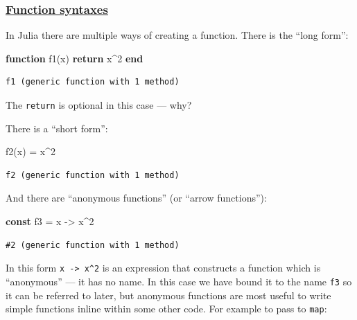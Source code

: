 \documentclass[
]{article}
\newenvironment{Shaded}{\begin{snugshade}}{\end{snugshade}}
\newcommand{\ControlFlowTok}[1]{\textcolor[rgb]{0.00,0.23,0.31}{\textbf{#1}}}
\newcommand{\FloatTok}[1]{\textcolor[rgb]{0.68,0.00,0.00}{#1}}
\newcommand{\FunctionTok}[1]{\textcolor[rgb]{0.28,0.35,0.67}{#1}}
\newcommand{\KeywordTok}[1]{\textcolor[rgb]{0.00,0.23,0.31}{\textbf{#1}}}
\newcommand{\NormalTok}[1]{\textcolor[rgb]{0.00,0.23,0.31}{#1}}
\newcommand{\OperatorTok}[1]{\textcolor[rgb]{0.37,0.37,0.37}{#1}}
\begin{document}
\subsubsection{\texorpdfstring{\href{https://docs.julialang.org/en/v1/manual/functions/\#man-functions}{Function
syntaxes}}{Function syntaxes}}\label{function-syntaxes}

In Julia there are multiple ways of creating a function. There is the
``long form'':

\begin{Shaded}
\begin{Highlighting}[]
\KeywordTok{function} \FunctionTok{f1}\NormalTok{(x)}
   \ControlFlowTok{return}\NormalTok{ x}\OperatorTok{\^{}}\FloatTok{2}
\KeywordTok{end}
\end{Highlighting}
\end{Shaded}

\begin{verbatim}
f1 (generic function with 1 method)
\end{verbatim}

The \texttt{return} is optional in this case --- why?

There is a ``short form'':

\begin{Shaded}
\begin{Highlighting}[]
\FunctionTok{f2}\NormalTok{(x) }\OperatorTok{=}\NormalTok{ x}\OperatorTok{\^{}}\FloatTok{2}
\end{Highlighting}
\end{Shaded}

\begin{verbatim}
f2 (generic function with 1 method)
\end{verbatim}

And there are ``anonymous functions'' (or ``arrow functions''):

\begin{Shaded}
\begin{Highlighting}[]
\KeywordTok{const}\NormalTok{ f3 }\OperatorTok{=}\NormalTok{ x }\OperatorTok{{-}\textgreater{}}\NormalTok{ x}\OperatorTok{\^{}}\FloatTok{2}
\end{Highlighting}
\end{Shaded}

\begin{verbatim}
#2 (generic function with 1 method)
\end{verbatim}

In this form \texttt{x\ -\textgreater{}\ x\^{}2} is an expression that
constructs a function which is ``anonymous'' --- it has no name. In this
case we have bound it to the name \texttt{f3} so it can be referred to
later, but anonymous functions are most useful to write simple functions
inline within some other code. For example to pass to \texttt{map}:
\end{document}
